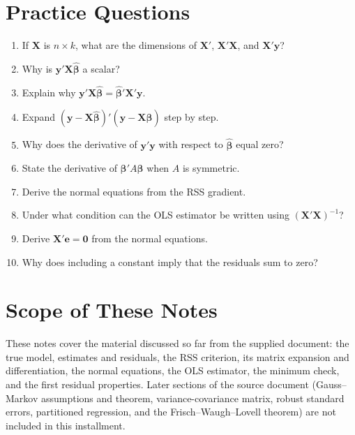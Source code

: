 \documentclass[11pt]{article}
\newcommand{\bhat}{\hat{\boldsymbol{\beta}}}
\newcommand{\ee}{\mathbf{e}}
\newcommand{\XX}{\mathbf{X}}
\newcommand{\yy}{\mathbf{y}}
\begin{document}
\section{Practice Questions}

\begin{enumerate}
    \item If $\XX$ is $n\times k$, what are the dimensions of $\XX'$, $\XX'\XX$, and $\XX'\yy$?
    \item Why is $\yy'\XX\bhat$ a scalar?
    \item Explain why $\yy'\XX\bhat=\bhat'\XX'\yy$.
    \item Expand $(\yy-\XX\bhat)'(\yy-\XX\bhat)$ step by step.
    \item Why does the derivative of $\yy'\yy$ with respect to $\bhat$ equal zero?
    \item State the derivative of $\boldsymbol{\beta}'A\boldsymbol{\beta}$ when $A$ is symmetric.
    \item Derive the normal equations from the RSS gradient.
    \item Under what condition can the OLS estimator be written using $(\XX'\XX)^{-1}$?
    \item Derive $\XX'\ee=\mathbf{0}$ from the normal equations.
    \item Why does including a constant imply that the residuals sum to zero?
\end{enumerate}

\section*{Scope of These Notes}
These notes cover the material discussed so far from the supplied document: the true model, estimates and residuals, the RSS criterion, its matrix expansion and differentiation, the normal equations, the OLS estimator, the minimum check, and the first residual properties. Later sections of the source document (Gauss--Markov assumptions and theorem, variance-covariance matrix, robust standard errors, partitioned regression, and the Frisch--Waugh--Lovell theorem) are not included in this installment.
\end{document}
